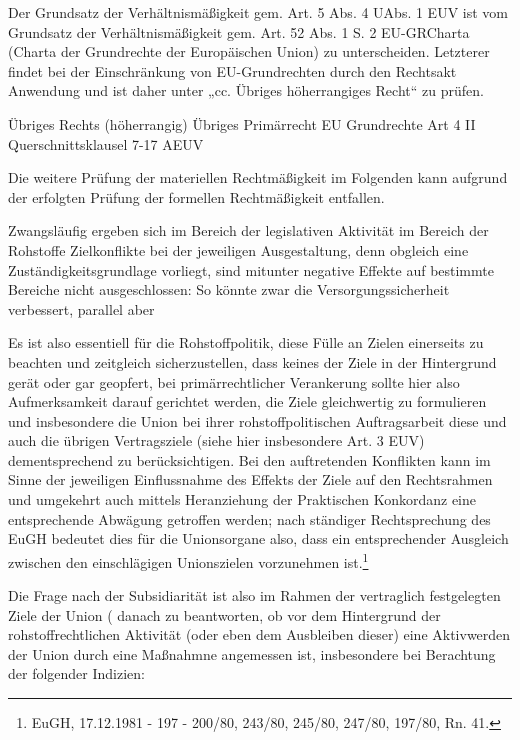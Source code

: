 \documentclass[12pt,a4paper,oneside]{book} %
\begin{document}
	Der Grundsatz der Verhältnismäßigkeit gem. Art. 5 Abs. 4 UAbs. 1 EUV ist vom Grundsatz der Verhältnismäßigkeit gem. Art. 52 Abs. 1 S. 2 EU-GRCharta (Charta der Grundrechte der Europäischen Union) zu unterscheiden. Letzterer findet bei der Einschränkung von EU-Grundrechten durch den Rechtsakt Anwendung und ist daher unter „cc. Übriges höherrangiges Recht“ zu prüfen.%
	
	Übriges Rechts (höherrangig)
	Übriges Primärrecht
	EU Grundrechte
	Art 4 II
	Querschnittsklausel 7-17 AEUV
	
	Die weitere Prüfung der materiellen Rechtmäßigkeit im Folgenden kann aufgrund der erfolgten Prüfung der formellen Rechtmäßigkeit entfallen.
	
	Zwangsläufig ergeben sich im Bereich der legislativen Aktivität im Bereich der Rohstoffe Zielkonflikte bei der jeweiligen Ausgestaltung, denn obgleich eine Zuständigkeitsgrundlage vorliegt, sind mitunter negative Effekte auf bestimmte Bereiche nicht ausgeschlossen: So könnte zwar die Versorgungssicherheit verbessert, parallel aber 
	
	Es ist also essentiell für die Rohstoffpolitik, diese Fülle an Zielen einerseits zu beachten und zeitgleich sicherzustellen, dass keines der Ziele in der Hintergrund gerät oder gar \glqq geopfert\grqq, bei primärrechtlicher Verankerung sollte hier also Aufmerksamkeit darauf gerichtet werden, die Ziele gleichwertig zu formulieren und insbesondere die Union bei ihrer rohstoffpolitischen Auftragsarbeit diese und auch die übrigen Vertragsziele (siehe hier insbesondere Art. 3 EUV) dementsprechend zu berücksichtigen. Bei den auftretenden Konflikten kann im Sinne der jeweiligen Einflussnahme des Effekts der Ziele auf den Rechtsrahmen und umgekehrt auch mittels Heranziehung der Praktischen Konkordanz eine entsprechende Abwägung getroffen werden; nach ständiger Rechtsprechung des EuGH bedeutet dies für die Unionsorgane also, dass ein entsprechender Ausgleich zwischen den einschlägigen Unionszielen vorzunehmen ist.\footnote{EuGH, 17.12.1981 - 197 - 200/80, 243/80, 245/80, 247/80, 197/80, Rn. 41.}
	
	Die Frage nach der Subsidiarität ist also im Rahmen der vertraglich festgelegten Ziele der Union (%
	danach zu beantworten, ob vor dem Hintergrund der rohstoffrechtlichen Aktivität (oder eben dem Ausbleiben dieser) eine Aktivwerden der Union durch eine Maßnahmne angemessen ist, insbesondere bei Berachtung der folgender Indizien\autocite[auch in Anlehnung an]{vd Groeben Schwarze Hatje, Vorbemerkung zu Art. 191 bis 193 AEUV, Rn. 115}:
	
\end{document}
